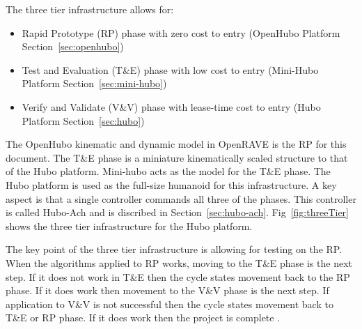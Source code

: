 The three tier infrastructure allows for:
\begin{itemize}
\item Rapid Prototype (RP) phase with zero cost to entry (OpenHubo Platform Section~\ref{sec:openhubo})
\item Test and Evaluation (T\&E) phase with low cost to entry (Mini-Hubo Platform Section~\ref{sec:mini-hubo})
\item Verify and Validate (V\&V) phase with lease-time cost to entry (Hubo Platform Section~\ref{sec:hubo})
\end{itemize}



The OpenHubo\cite{6385987} kinematic and dynamic model in OpenRAVE\cite{diankovThesis} is the RP for this document.
The T\&E phase is a miniature kinematically scaled structure to that of the Hubo platform.
Mini-hubo\cite{threeTier} acts as the model for the T\&E phase.
The Hubo platform\cite{4058572} is used as the full-size humanoid for this infrastructure.  
A key aspect is that a single controller commands all three of the phases.
This controller is called Hubo-Ach and is discribed in Section~\ref{sec:hubo-ach}.
Fig~\ref{fig:threeTier} shows the three tier infrastructure for the Hubo platform.

The key point of the three tier infrastructure is allowing for testing on the RP.
When the algorithms applied to RP works, moving to the T\&E phase is the next step.
If it does not work in T\&E then the cycle states movement back to the RP phase.
If it does work then movement to the V\&V phase is the next step.
If application to V\&V is not successful then the cycle states movement back to T\&E or RP phase.
If it does work then the project is complete \cite{threeTier}.

